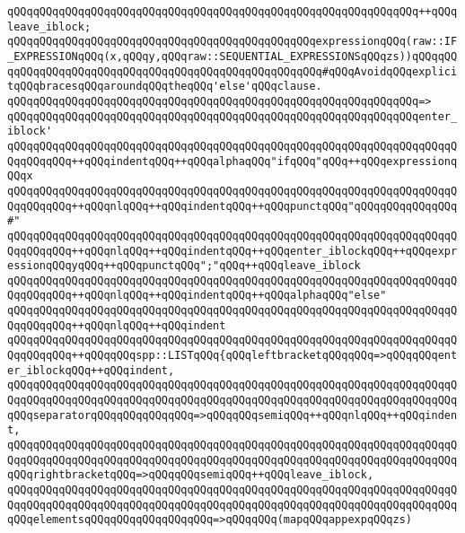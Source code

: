 \verb|qQQqqQQqqQQqqQQqqQQqqQQqqQQqqQQqqQQqqQQqqQQqqQQqqQQqqQQqqQQqqQQq++qQQqleave_iblock;|\newline
\newline
\verb|qQQqqQQqqQQqqQQqqQQqqQQqqQQqqQQqqQQqqQQqqQQqqQQqexpressionqQQq(raw::IF_EXPRESSIONqQQq(x,qQQqy,qQQqraw::SEQUENTIAL_EXPRESSIONSqQQqzs))qQQqqQQqqQQqqQQqqQQqqQQqqQQqqQQqqQQqqQQqqQQqqQQqqQQqqQQq#qQQqAvoidqQQqexplicitqQQqbracesqQQqaroundqQQqtheqQQq'else'qQQqclause.|\newline
\verb|qQQqqQQqqQQqqQQqqQQqqQQqqQQqqQQqqQQqqQQqqQQqqQQqqQQqqQQqqQQqqQQq=>|\newline
\verb|qQQqqQQqqQQqqQQqqQQqqQQqqQQqqQQqqQQqqQQqqQQqqQQqqQQqqQQqqQQqqQQqenter_iblock'|\newline
\verb|qQQqqQQqqQQqqQQqqQQqqQQqqQQqqQQqqQQqqQQqqQQqqQQqqQQqqQQqqQQqqQQqqQQqqQQqqQQqqQQq++qQQqindentqQQq++qQQqalphaqQQq"ifqQQq"qQQq++qQQqexpressionqQQqx|\newline
\verb|qQQqqQQqqQQqqQQqqQQqqQQqqQQqqQQqqQQqqQQqqQQqqQQqqQQqqQQqqQQqqQQqqQQqqQQqqQQqqQQq++qQQqnlqQQq++qQQqindentqQQq++qQQqpunctqQQq"qQQqqQQqqQQqqQQq#"|\newline
\verb|qQQqqQQqqQQqqQQqqQQqqQQqqQQqqQQqqQQqqQQqqQQqqQQqqQQqqQQqqQQqqQQqqQQqqQQqqQQqqQQq++qQQqnlqQQq++qQQqindentqQQq++qQQqenter_iblockqQQq++qQQqexpressionqQQqyqQQq++qQQqpunctqQQq";"qQQq++qQQqleave_iblock|\newline
\verb|qQQqqQQqqQQqqQQqqQQqqQQqqQQqqQQqqQQqqQQqqQQqqQQqqQQqqQQqqQQqqQQqqQQqqQQqqQQqqQQq++qQQqnlqQQq++qQQqindentqQQq++qQQqalphaqQQq"else"|\newline
\verb|qQQqqQQqqQQqqQQqqQQqqQQqqQQqqQQqqQQqqQQqqQQqqQQqqQQqqQQqqQQqqQQqqQQqqQQqqQQqqQQq++qQQqnlqQQq++qQQqindent|\newline
\verb|qQQqqQQqqQQqqQQqqQQqqQQqqQQqqQQqqQQqqQQqqQQqqQQqqQQqqQQqqQQqqQQqqQQqqQQqqQQqqQQq++qQQqqQQqspp::LISTqQQq{qQQqleftbracketqQQqqQQq=>qQQqqQQqenter_iblockqQQq++qQQqindent,|\newline
\verb|qQQqqQQqqQQqqQQqqQQqqQQqqQQqqQQqqQQqqQQqqQQqqQQqqQQqqQQqqQQqqQQqqQQqqQQqqQQqqQQqqQQqqQQqqQQqqQQqqQQqqQQqqQQqqQQqqQQqqQQqqQQqqQQqqQQqqQQqqQQqqQQqseparatorqQQqqQQqqQQqqQQq=>qQQqqQQqsemiqQQq++qQQqnlqQQq++qQQqindent,|\newline
\verb|qQQqqQQqqQQqqQQqqQQqqQQqqQQqqQQqqQQqqQQqqQQqqQQqqQQqqQQqqQQqqQQqqQQqqQQqqQQqqQQqqQQqqQQqqQQqqQQqqQQqqQQqqQQqqQQqqQQqqQQqqQQqqQQqqQQqqQQqqQQqqQQqrightbracketqQQq=>qQQqqQQqsemiqQQq++qQQqleave_iblock,|\newline
\verb|qQQqqQQqqQQqqQQqqQQqqQQqqQQqqQQqqQQqqQQqqQQqqQQqqQQqqQQqqQQqqQQqqQQqqQQqqQQqqQQqqQQqqQQqqQQqqQQqqQQqqQQqqQQqqQQqqQQqqQQqqQQqqQQqqQQqqQQqqQQqqQQqelementsqQQqqQQqqQQqqQQqqQQq=>qQQqqQQq(mapqQQqappexpqQQqzs)|\newline

